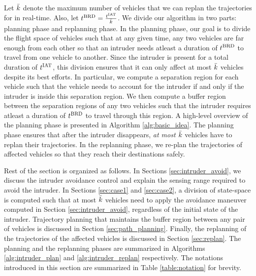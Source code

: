 Let $\bar{k}$ denote the maximum number of vehicles that we can replan the trajectories for in real-time. Also, let $t^\text{BRD} = \frac{t^\text{IAT}}{\bar{k}}$. We divide our algorithm in two parts: planning phase and replanning phase. In the planning phase, our goal is to divide the flight space of vehicles such that at any given time, any two vehicles are far enough from each other so that an intruder needs atleast a duration of $t^\text{BRD}$ to travel from one vehicle to another. Since the intruder is present for a total duration of $t^\text{IAT}$, this division ensures that it can only affect at most $\bar{k}$ vehicles despite its best efforts. In particular, we compute a separation region for each vehicle such that the vehicle needs to account for the intruder if and only if the intruder is inside this separation region. We then compute a buffer region between the separation regions of any two vehicles such that the intruder requires atleast a duration of $t^\text{BRD}$ to travel through this region. A high-level overview of the planning phase is presented in Algorithm \ref{alg:basic_idea}. The planning phase ensures that after the intruder disappears, \textit{at most $\bar{k}$} vehicles have to replan their trajectories. In the replanning phase, we re-plan the trajectories of affected vehicles so that they reach their destinations safely. %

Rest of the section is organized as follows. In Sections \ref{sec:intruder_avoid}, we discuss the intruder avoidance control and explain the sensing range required to avoid the intruder. In Sections \ref{sec:case1} and \ref{sec:case2}, a division of state-space is computed such that at most $\bar{k}$ vehicles need to apply the avoidance maneuver computed in Section \ref{sec:intruder_avoid}, regardless of the initial state of the intruder. %
Trajectory planning that maintains the buffer region between any pair of vehicles is discussed in Section \ref{sec:path_planning}. Finally, the replanning of the trajectories of the affected vehicles is discussed in Section \ref{sec:replan}. The planning and the replanning phases are summarized in Algorithms \ref{alg:intruder_plan} and \ref{alg:intruder_replan} respectively. The notations introduced in this section are summarized in Table \ref{table:notation} for brevity.